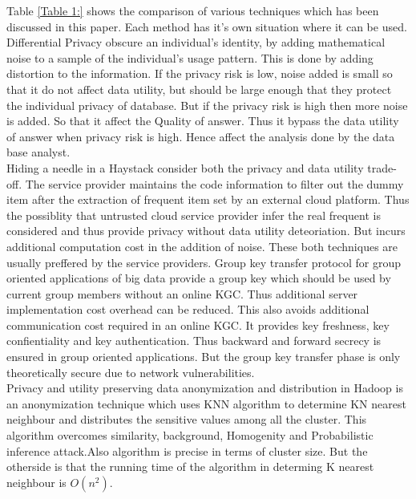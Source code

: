 \documentclass[10pt,a4paper,journal]{IEEEtran}
\begin{document}
\hspace{2em} Table \ref{Table 1:} shows the comparison of various techniques which has been discussed in this paper. Each method has it's own situation where it can be used. Differential Privacy obscure an individual's identity, by adding mathematical noise to a sample of the individual's usage pattern. This is done by adding distortion to the information. If the privacy risk is low, noise added is small so that it do not affect data utility, but should be large enough that they protect the individual privacy of database. But if the privacy risk is high then more noise is added. So that it affect the Quality of answer. Thus it bypass the data utility of answer when privacy risk is high. Hence affect the analysis done by the data base analyst.\\
\hspace{2em} Hiding a needle in a Haystack  consider both the privacy and data utility trade-off. The service provider maintains the code information to filter out the dummy item after the extraction of frequent item set by an external cloud platform. Thus the possiblity that untrusted cloud service provider infer the real frequent is considered and thus provide privacy without data utility deteoriation. But incurs additional computation cost in the addition of noise. These both techniques are usually preffered by the service providers. Group key transfer protocol for group oriented applications of big data provide a group key which should be used by current group members without an online KGC. Thus additional server implementation cost overhead can be reduced. This also avoids additional communication cost required in an online KGC. It provides key freshness, key confientiality and key authentication. Thus backward and forward secrecy is ensured in group oriented applications. But the group key transfer phase is only theoretically secure due to network vulnerabilities.\\
\hspace{2em}Privacy and utility  preserving data anonymization and distribution in Hadoop is an anonymization technique which uses KNN algorithm to determine KN nearest neighbour and distributes the sensitive values among all the cluster. This algorithm overcomes similarity, background, Homogenity and Probabilistic inference attack.Also algorithm is precise in terms of cluster size. But the otherside is that the running time of the algorithm in determing K nearest neighbour is \textit{$O(n^{2})$}.\\
\end{document}
